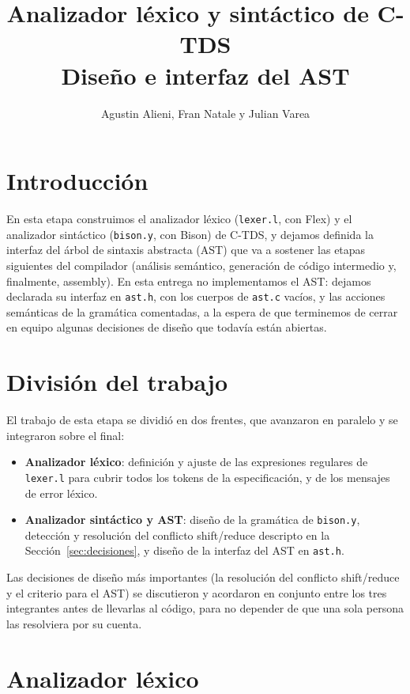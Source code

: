 \documentclass[11pt,a4paper]{article}
\title{Analizador léxico y sintáctico de C-TDS \\ \large Diseño e interfaz del AST}
\author{Agustin Alieni, Fran Natale y Julian Varea}
\date{}
\begin{document}
\maketitle

\section{Introducción}

En esta etapa construimos el analizador léxico (\texttt{lexer.l}, con Flex) y
el analizador sintáctico (\texttt{bison.y}, con Bison) de C-TDS, y dejamos
definida la interfaz del árbol de sintaxis abstracta (AST) que va a sostener
las etapas siguientes del compilador (análisis semántico, generación de
código intermedio y, finalmente, assembly). En esta entrega no implementamos
el AST: dejamos declarada su interfaz en \texttt{ast.h}, con los cuerpos de
\texttt{ast.c} vacíos, y las acciones semánticas de la gramática comentadas,
a la espera de que terminemos de cerrar en equipo algunas decisiones de
diseño que todavía están abiertas.

\section{División del trabajo}

El trabajo de esta etapa se dividió en dos frentes, que avanzaron en paralelo
y se integraron sobre el final:

\begin{itemize}
  \item \textbf{Analizador léxico}: definición y ajuste de las expresiones
  regulares de \texttt{lexer.l} para cubrir todos los tokens de la
  especificación, y de los mensajes de error léxico.
  \item \textbf{Analizador sintáctico y AST}: diseño de la gramática de
  \texttt{bison.y}, detección y resolución del conflicto shift/reduce
  descripto en la Sección~\ref{sec:decisiones}, y diseño de la interfaz del
  AST en \texttt{ast.h}.
\end{itemize}

Las decisiones de diseño más importantes (la resolución del conflicto
shift/reduce y el criterio para el AST) se discutieron y acordaron en
conjunto entre los tres integrantes antes de llevarlas al código, para no
depender de que una sola persona las resolviera por su cuenta.

\section{Analizador léxico}
\end{document}
